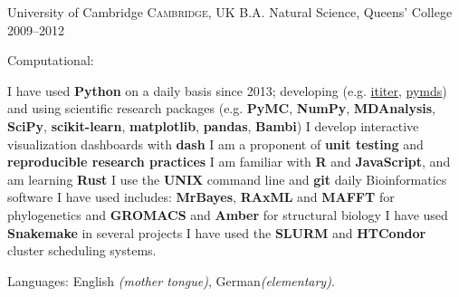 \documentclass[10pt,a4paper]{article}
\begin{document}
\headedsection
{University of Cambridge}
{\textsc{Cambridge, UK}} {%
  \headedsubsection
  {B.A. Natural Science, Queens' College}
  {2009--2012}
  {
  }
}

\spacedhrule{0.9em}{-0.4em}


\inlineheadsection  %
{Computational:} {

  I have used \textbf{Python} on a daily basis since 2013; developing (e.g.\@
  \href{https://ititer.readthedocs.io/}{ititer},
  \href{https://pymds.readthedocs.io}{pymds}) and using scientific research packages
  (e.g. \textbf{PyMC}, \textbf{NumPy}, \textbf{MDAnalysis}, \textbf{SciPy},
  \textbf{scikit-learn}, \textbf{matplotlib}, \textbf{pandas}, \textbf{Bambi}) \sbull I
  develop interactive visualization dashboards with \textbf{dash} \sbull I am a proponent of
  \textbf{unit testing} and \textbf{reproducible research practices} \sbull I am familiar
  with \textbf{R} and \textbf{JavaScript}, and am learning \textbf{Rust} \sbull I use the
  \textbf{UNIX} command line and \textbf{git} daily \sbull Bioinformatics software I have
  used includes: \textbf{MrBayes}, \textbf{RAxML} and \textbf{MAFFT} for phylogenetics
  and \textbf{GROMACS} and \textbf{Amber} for structural biology \sbull I have used
  \textbf{Snakemake} in several projects \sbull I have used the \textbf{SLURM} and
  \textbf{HTCondor} cluster scheduling systems.}

\vspace{0.5em}
\inlineheadsection
{Languages:}
{English \emph{(mother tongue)}, German\emph{(elementary)}.}


\nocite{*}


\printbibliography[title=Current Projects,category=projects]

\printbibliography[title=Publications,notcategory=projects]
\end{document}
